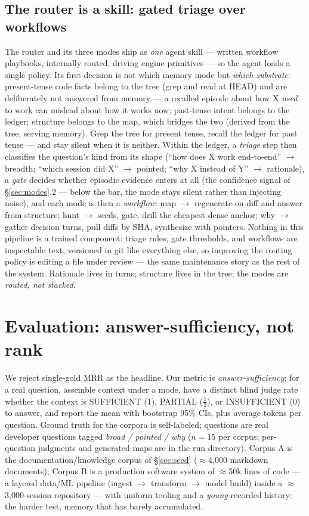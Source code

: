 \documentclass[twocolumn,10pt]{article}
\begin{document}
\subsection{The router is a skill: gated triage over workflows}\label{sec:router}

The router and its three modes ship as \emph{one} agent skill --- written workflow playbooks, internally routed, driving engine primitives --- so the agent loads a single policy. Its first decision is not which memory mode but \emph{which substrate}: present-tense code facts belong to the tree (grep and read at HEAD) and are deliberately not answered from memory --- a recalled episode about how X \emph{used} to work can mislead about how it works now; past-tense intent belongs to the ledger; structure belongs to the map, which bridges the two (derived from the tree, serving memory). Grep the tree for present tense, recall the ledger for past tense --- and stay silent when it is neither. Within the ledger, a \emph{triage} step then classifies the question's kind from its shape (``how does X work end-to-end'' $\to$ breadth; ``which session did X'' $\to$ pointed; ``why X instead of Y'' $\to$ rationale), a \emph{gate} decides whether episodic evidence enters at all (the confidence signal of \S\ref{sec:modes}.2 --- below the bar, the mode stays silent rather than injecting noise), and each mode is then a \emph{workflow}: map $\to$ regenerate-on-diff and answer from structure; hunt $\to$ seeds, gate, drill the cheapest dense anchor; why $\to$ gather decision turns, pull diffs by SHA, synthesize with pointers. Nothing in this pipeline is a trained component: triage rules, gate thresholds, and workflows are inspectable text, versioned in git like everything else, so improving the routing policy is editing a file under review --- the same maintenance story as the rest of the system. Rationale lives in turns; structure lives in the tree; the modes are \emph{routed, not stacked}.

\section{Evaluation: answer-sufficiency, not rank}\label{sec:eval}

We reject single-gold MRR as the headline. Our metric is \emph{answer-sufficiency}: for a real question, assemble context under a mode, have a distinct blind judge rate whether the context is SUFFICIENT (1), PARTIAL ($\tfrac12$), or INSUFFICIENT (0) to answer, and report the mean with bootstrap 95\% CIs, plus average tokens per question. Ground truth for the corpora is self-labeled; questions are real developer questions tagged \emph{broad / pointed / why} ($n{=}15$ per corpus; per-question judgments and generated maps are in the run directory). Corpus A is the documentation/knowledge corpus of \S\ref{sec:seed} ($\approx$4{,}000 markdown documents); Corpus B is a production software system of $\approx$50k lines of code --- a layered data/ML pipeline (ingest $\to$ transform $\to$ model build) inside a $\approx$3{,}000-session repository --- with uniform tooling and a \emph{young} recorded history: the harder test, memory that has barely accumulated.
\end{document}
